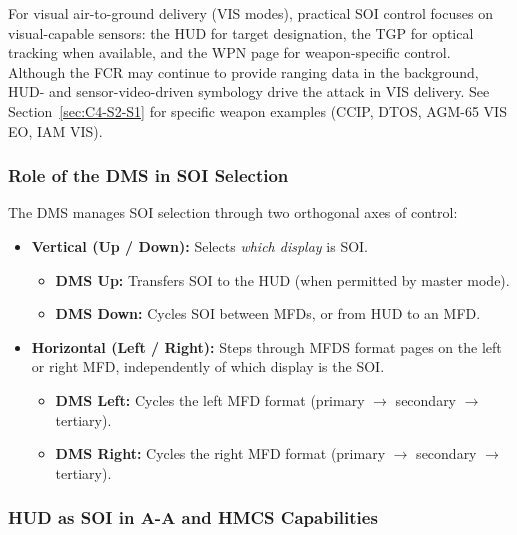 \documentclass[11pt,a4paper]{article}
\begin{document}
For visual air-to-ground delivery (VIS modes), practical SOI control focuses on visual-capable sensors: the HUD for target designation, the TGP for optical tracking when available, and the WPN page for weapon-specific control. Although the FCR may continue to provide ranging data in the background, HUD- and sensor-video-driven symbology drive the attack in VIS delivery. See Section~\ref{sec:C4-S2-S1} for specific weapon examples (CCIP, DTOS, AGM-65 VIS EO, IAM VIS).
\subsubsection{Role of the DMS in SOI Selection}
\label{sec:C4-S1-S2}

The DMS manages SOI selection through two orthogonal axes of control:

\begin{itemize}
    \item \textbf{Vertical (Up / Down):} Selects \textit{which display} is SOI.
        \begin{itemize}
            \item \textbf{DMS Up:} Transfers SOI to the HUD (when permitted by master mode).
            \item \textbf{DMS Down:} Cycles SOI between MFDs, or from HUD to an MFD.
        \end{itemize}
    \item \textbf{Horizontal (Left / Right):} Steps through MFDS format pages on the left or right MFD, independently of which display is the SOI.
        \begin{itemize}
            \item \textbf{DMS Left:} Cycles the left MFD format (primary $\to$ secondary $\to$ tertiary).
            \item \textbf{DMS Right:} Cycles the right MFD format (primary $\to$ secondary $\to$ tertiary).
        \end{itemize}
\end{itemize}
\subsubsection{HUD as SOI in A-A and HMCS Capabilities}
\label{sec:C4-S1-S3}
\end{document}
